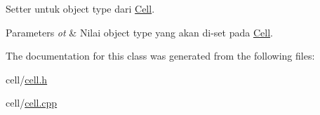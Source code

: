 Setter untuk object type dari \hyperlink{classCell}{Cell}. 


\begin{DoxyParams}{Parameters}
{\em ot} & Nilai object type yang akan di-\/set pada \hyperlink{classCell}{Cell}. \\
\hline
\end{DoxyParams}


The documentation for this class was generated from the following files\+:\begin{DoxyCompactItemize}
\item 
cell/\hyperlink{cell_8h}{cell.\+h}\item 
cell/\hyperlink{cell_8cpp}{cell.\+cpp}\end{DoxyCompactItemize}
